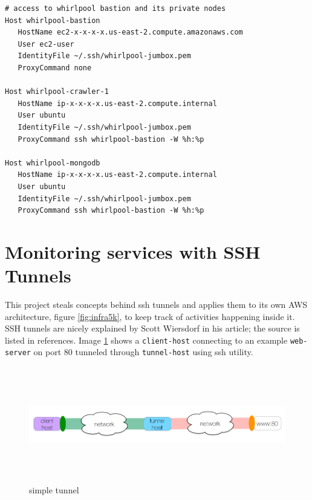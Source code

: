 \begin{verbatim}
# access to whirlpool bastion and its private nodes
Host whirlpool-bastion
   HostName ec2-x-x-x-x.us-east-2.compute.amazonaws.com
   User ec2-user
   IdentityFile ~/.ssh/whirlpool-jumbox.pem
   ProxyCommand none

Host whirlpool-crawler-1
   HostName ip-x-x-x-x.us-east-2.compute.internal
   User ubuntu
   IdentityFile ~/.ssh/whirlpool-jumbox.pem
   ProxyCommand ssh whirlpool-bastion -W %h:%p

Host whirlpool-mongodb
   HostName ip-x-x-x-x.us-east-2.compute.internal
   User ubuntu
   IdentityFile ~/.ssh/whirlpool-jumbox.pem
   ProxyCommand ssh whirlpool-bastion -W %h:%p
\end{verbatim}

\pagebreak

\section{Monitoring services with SSH Tunnels}
This project steals concepts behind ssh tunnels \cite{tunnels} and applies them to its own AWS architecture, figure \ref{fig:infra5k}, to keep track of activities happening inside it. SSH tunnels are nicely explained by Scott Wiersdorf in his article; the source is listed in references. Image \ref{fig:simpletunnel} 
shows a \texttt{client-host} connecting to an example \texttt{web-server} on port 80 tunneled 
through \texttt{tunnel-host} using ssh utility.

\begin{figure}[h!]
  \centering
  \includegraphics[width=15cm,height=5cm,keepaspectratio]{../media/crawler/simple-tunnel.png}
  \caption{simple tunnel \cite{tunnels}}
  \label{fig:simpletunnel}
\end{figure}

